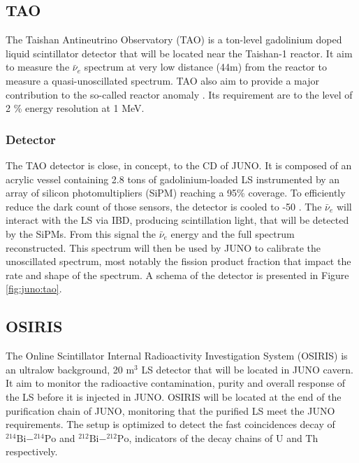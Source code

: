 \documentclass[../main.tex]{subfiles}
\begin{document}
\subsection{TAO}
\label{sec:juno:tao}
The Taishan Antineutrino Observatory (TAO) \cite{juno_collaboration_tao_2020, steiger_tao_2022} is a ton-level gadolinium doped liquid scintillator detector that will be located near the Taishan-1 reactor. It aim to measure the $\bar{\nu}_e$ spectrum at very low distance (44m) from the reactor to measure a quasi-unoscillated spectrum. TAO also aim to provide a major contribution to the so-called reactor anomaly \cite{mention_reactor_2011}. Its requirement are to the level of 2 \% energy resolution at 1 MeV.

\subsubsection{Detector}

The TAO detector is close, in concept, to the CD of JUNO. It is composed of an acrylic vessel containing 2.8 tons of gadolinium-loaded LS instrumented by an array of silicon photomultipliers (SiPM) reaching a 95\% coverage. To efficiently reduce the dark count of those sensors, the detector is cooled to -50 \textcelsius.
The $\bar{\nu}_e$ will interact with the LS via IBD, producing scintillation light, that will be detected by the SiPMs. From this signal the $\bar{\nu}_e$ energy and the full spectrum reconstructed.
This spectrum will then be used by JUNO to calibrate the unoscillated spectrum, most notably the fission product fraction that impact the rate and shape of the spectrum. A schema of the detector is presented in Figure \ref{fig:juno:tao}.

\subsection{OSIRIS}
\label{sec:juno:OSIRIS}
The Online Scintillator Internal Radioactivity Investigation System (OSIRIS) \cite{juno_collaboration_design_2021} is an ultralow background, 20 m$^3$ LS detector that will be located in JUNO cavern. It aim to monitor the radioactive contamination, purity and overall response of the LS before it is injected in JUNO.
OSIRIS will be located at the end of the purification chain of JUNO, monitoring that the purified LS meet the JUNO requirements. The setup is optimized to detect the fast coincidences decay of $^{214}\mathrm{Bi}-^{214}\mathrm{Po}$ and $^{212}\mathrm{Bi}-^{212}\mathrm{Po}$, indicators of the decay chains of U and Th respectively.
\end{document}

